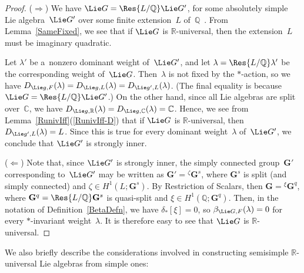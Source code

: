 \documentclass[pdftex]{sigma}
\numberwithin{equation}{section}
\begin{document}
\begin{proof}
($\Rightarrow$) We have $\Lie G = \Res{L/\mathbb{Q}} \Lie G'$, for some absolutely simple Lie algebra~$\Lie G'$ over
some f\/inite extension~$L$ of~$\mathbb{Q}$~\cite[\S~3.1.2]{Tits-Classification}.
From Lemma~\ref{SameFixed}, we see that if $\Lie G$ is $\mathbb{R}$-universal, then the extension~$L$ must be imaginary
quadratic.

Let $\lambda'$ be a~nonzero dominant weight of~$\Lie G'$, and let $\lambda = \Res{L/\mathbb{Q}} \lambda'$ be the
corresponding weight of~$\Lie G$.
Then~$\lambda$ is not f\/ixed by the $*$-action, so we have $D_{\Lie g, F}(\lambda) = D_{\Lie g, L}(\lambda) = D_{\Lie g',
L}(\lambda)$.
(The f\/inal equality is because $\Lie G = \Res{L/\mathbb{Q}} \Lie G'$.) On the other hand, since all Lie algebras are
split over~$\mathbb{C}$, we have $D_{\Lie g, \mathbb{R}}(\lambda) = D_{\Lie g, \mathbb{C}}(\lambda) = \mathbb{C}$.
Hence, we see from Lemma~\ref{RunivIff}(\ref{RunivIff-D}) that if $\Lie G$ is $\mathbb{R}$-universal, then $D_{\Lie g', L}(\lambda)
= L$.
Since this is true for every dominant weight~$\lambda$ of~$\Lie G'$, we conclude that $\Lie G'$ is strongly inner.

($\Leftarrow$) Note that, since $\Lie G'$ is strongly inner, the simply connected group~$\mathbf{G}'$ corresponding
to~$\Lie G'$ may be written as $\mathbf{G}' = {}^{\zeta} \mathbf{G}^s$, where $\mathbf{G}^s$ is split (and simply
connected) and $\zeta \in H^1(L; \mathbf{G}^s)$.
By Restriction of Scalars, then $\mathbf{G} = {}^{\xi} \mathbf{G}^q$, where $\mathbf{G}^q = \Res{L/\mathbb{Q}}
\mathbf{G}^s$ is quasi-split and $\xi \in H^1(\mathbb{Q}; \mathbf{G}^q)$.
Then, in the notation of Def\/inition~\ref{BetaDefn}, we have $\delta_*[\xi] = 0$, so $\beta_{\Lie G, F}(\lambda) = 0$ for every
$*$-invariant weight~$\lambda$.
It is therefore easy to see that $\Lie G$ is $\mathbb{R}$-universal.
\end{proof}

We also brief\/ly describe the considerations involved in constructing semisimple $\mathbb{R}$-universal Lie algebras from
simple ones:
\end{document}
